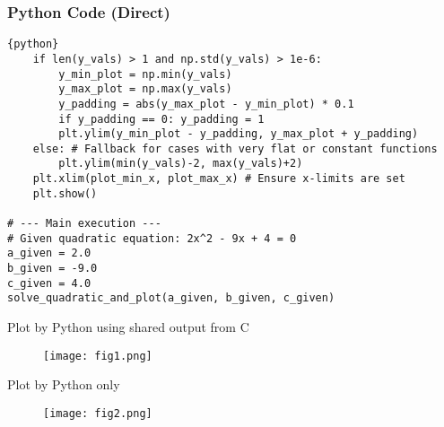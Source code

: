 \documentclass{beamer}
\begin{document}
\begin{frame}[fragile]
\frametitle{Python Code (Direct)}
\begin{lstlisting}{python}
    if len(y_vals) > 1 and np.std(y_vals) > 1e-6:
        y_min_plot = np.min(y_vals)
        y_max_plot = np.max(y_vals)
        y_padding = abs(y_max_plot - y_min_plot) * 0.1
        if y_padding == 0: y_padding = 1
        plt.ylim(y_min_plot - y_padding, y_max_plot + y_padding)
    else: # Fallback for cases with very flat or constant functions
        plt.ylim(min(y_vals)-2, max(y_vals)+2)
    plt.xlim(plot_min_x, plot_max_x) # Ensure x-limits are set
    plt.show()

# --- Main execution ---
# Given quadratic equation: 2x^2 - 9x + 4 = 0
a_given = 2.0
b_given = -9.0
c_given = 4.0
solve_quadratic_and_plot(a_given, b_given, c_given)
\end{lstlisting}
\end{frame}

\begin{frame}{Plot by Python using shared output from C}
\begin{figure}[H]
\centering
\texttt{[image: fig1.png]}
\caption{}
\label{fig:1}
\end{figure}
\end{frame}

\begin{frame}{Plot by Python only}
\begin{figure}[H]
\centering
\texttt{[image: fig2.png]}
\caption{}
\label{fig:2}
\end{figure}
\end{frame}
\end{document}
